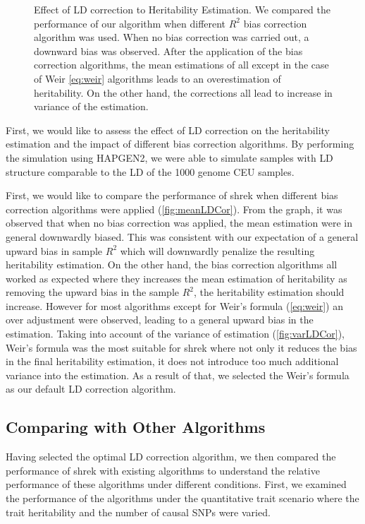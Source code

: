 \begin{figure}
{				\label{fig:varLDCor}
			}
			\caption[Effect of LD correction to Heritability Estimation]
			{Effect of LD correction to Heritability Estimation.
				We compared the performance of our algorithm when different $R^2$ bias correction algorithm was used.
				When no bias correction was carried out, a downward bias was observed. 
				After the application of the bias correction algorithms, the mean estimations of all except in the case of Weir \cref{eq:weir} algorithms leads to an overestimation of heritability.
				On the other hand, the corrections all lead to increase in variance of the estimation.
			} 
			\label{fig:ldCorCom}
		\end{figure}
		First, we would like to assess the effect of \gls{LD} correction on the heritability estimation and the impact of different bias correction algorithms. 
		By performing the simulation using HAPGEN2, we were able to simulate samples with \gls{LD} structure comparable to the \gls{LD} of the 1000 genome \gls{CEU} samples.
		
		First, we would like to compare the performance of \gls{shrek} when different bias correction algorithms were applied (\cref{fig:meanLDCor}).
		From the graph, it was observed that when no bias correction was applied, the mean estimation were in general downwardly biased.
		This was consistent with our expectation of a general upward bias in sample $R^2$ which will downwardly penalize the resulting heritability estimation.
		On the other hand, the bias correction algorithms all worked as expected where they increases the mean estimation of heritability as removing the upward bias in the sample $R^2$, the heritability estimation should increase.
		However for most algorithms except for Weir's formula (\cref{eq:weir}) an over adjustment were observed, leading to a general upward bias in the estimation.
		Taking into account of the variance of estimation (\cref{fig:varLDCor}), Weir's formula was the most suitable for \gls{shrek} where not only it reduces the bias in the final heritability estimation, it does not introduce too much additional variance into the estimation.
		As a result of that, we selected the Weir's formula as our default \gls{LD} correction algorithm.
		
		\subsection{Comparing with Other Algorithms}
		Having selected the optimal \gls{LD} correction algorithm, we then compared the performance of \gls{shrek} with existing algorithms to understand the relative performance of these algorithms under different conditions.
		First, we examined the performance of the algorithms under the quantitative trait scenario where the trait heritability and the number of causal \glspl{SNP} were varied.
		
